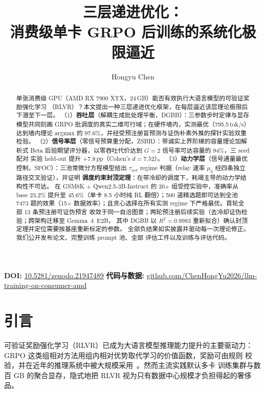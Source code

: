 \documentclass[11pt]{article}
\title{\textbf{三层递进优化：\\消费级单卡 GRPO 后训练的系统化极限逼近}}
\author{Hongyu Chen}
\date{}
\theoremstyle{definition}
\begin{document}
\maketitle
\vspace{-2em}
\begin{center}\small
\textbf{DOI:} \href{https://doi.org/10.5281/zenodo.21947489}{10.5281/zenodo.21947489} \quad
\textbf{代码与数据:} \href{https://github.com/ChenHongYu2026/llm-training-on-consumer-amd}{github.com/ChenHongYu2026/llm-training-on-consumer-amd}
\end{center}
\vspace{1em}

\begin{abstract}
单张消费级 GPU（AMD RX 7900 XTX，24\,GB）能否有效执行大语言模型的可验证奖励强化学习
（RLVR）？本文提出一种三层递进优化框架，在每层逼近该层理论极限后下潜至下一层。
（1）\textbf{吞吐层}（解耦生成批处理平衡，DGBB）：三参数步时定律与显存模型共同刻画
GRPO 批调度的真实二维可行域；在硬件墙内，实测最优（795.5\,tok/s）达到墙内理论
argmax 的 97.6\%，并经受预注册盲预测与证伪朴素外推的探针实验双重检验。
（2）\textbf{信号率层}（零信号预算重分配，ZSBR）：带诚实上界阶梯的容量理论加解析式
Beta 后验期望评分器，以零吞吐代价达到 $G{=}2$ 信号率可达容量的 94\%，三 seed 配对
实验 held-out 提升 $+7.8$\,pp（Cohen's $d{=}7.52$）。
（3）\textbf{动力学层}（信号通量最优控制，SFOC）：三池常微分方程模型给出
$\tau_{net}$ regime 判据（relay 速率 $\mu_0$ 经四条独立路径交叉验证），并证明
\textbf{调度约束封顶定理}：在带冷却的调度下，耗竭主导的动力学结构性不可达。
在 GSM8K + Qwen2.5-3B-Instruct 的 20+ 组受控实验中，准确率从 base 23.2\% 提升至
45.6\%（单卡 8.5 小时纯 RL 翻倍）；500 道精选题即可达到全池 7473 题的效果（15$\times$
数据效率）；且贪心选择在所有实测 regime 下严格最优。首轮全部 13 条预注册可证伪预言
收敛于同一自洽图景；两轮预注册后续实验（去冷却证伪检验；跨架构迁移至 Gemma~4~E2B，
其中 DGBB 以 $R^2{=}0.9983$ 重新拟合）确认封顶定理并定位需要按基座重新标定的参数。
全部负结果如实披露并驱动每一次理论修正。我们公开发布论文、完整训练 prompt 池、全部
评估工件以及训练与评估代码。
\end{abstract}

\section{引言}\label{sec:intro}
可验证奖励强化学习（RLVR）已成为大语言模型推理能力提升的主要驱动力：GRPO
\citep{shao2024grpo} 这类组相对方法用组内相对优势取代学习的价值函数，奖励可由规则
校验，并在近年的推理系统中被大规模采用~\citep{yu2025dapo}。然而主流实践默认多卡
训练集群与数百 GB 的聚合显存，隐式地把 RLVR 视为只有数据中心规模才负担得起的奢侈品。
\end{document}
